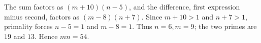 The sum factors as $(m+10)(n-5)$, and the difference, first expression minus second, factors as $(m-8)(n+7)$. Since $m+10>1$ and $n+7>1$, primality forces $n-5=1$ and $m-8=1$. Thus $n=6,m=9$; the two primes are $19$ and $13$. Hence $\boxed{mn=54}$.
